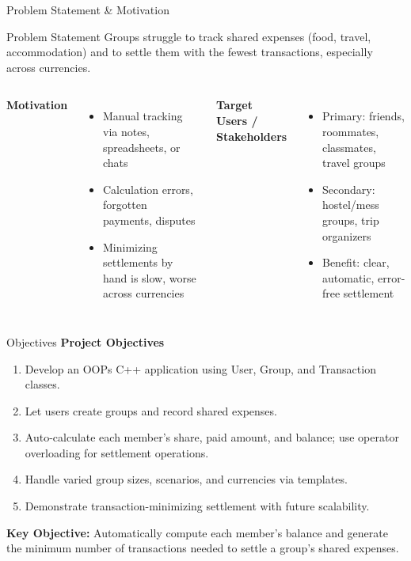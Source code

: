 \documentclass[aspectratio=169,11pt]{beamer}
\begin{document}
\begin{frame}{Problem Statement \& Motivation}
\small
\begin{block}{Problem Statement}
Groups struggle to track shared expenses (food, travel, accommodation) and to settle them with the fewest transactions, especially across currencies.
\end{block}
\vspace{2mm}
\begin{columns}[T,totalwidth=\textwidth]
\textbf{\color{GEUBlue}Motivation}
\begin{itemize}\itemsep1pt
\item Manual tracking via notes, spreadsheets, or chats
\item Calculation errors, forgotten payments, disputes
\item Minimizing settlements by hand is slow, worse across currencies
\end{itemize}
\textbf{\color{GEUBlue}Target Users / Stakeholders}
\begin{itemize}\itemsep1pt
\item Primary: friends, roommates, classmates, travel groups
\item Secondary: hostel/mess groups, trip organizers
\item Benefit: clear, automatic, error-free settlement
\end{itemize}
\end{columns}
\end{frame}

\begin{frame}{Objectives}
\small
\textbf{\color{GEUBlue}Project Objectives}
\vspace{2mm}
\begin{enumerate}\itemsep3pt
\item Develop an OOPs C++ application using User, Group, and Transaction classes.
\item Let users create groups and record shared expenses.
\item Auto-calculate each member's share, paid amount, and balance; use operator overloading for settlement operations.
\item Handle varied group sizes, scenarios, and currencies via templates.
\item Demonstrate transaction-minimizing settlement with future scalability.
\end{enumerate}
\vfill
\begin{center}
\colorbox{GEULightBlue}{\parbox{.80\textwidth}{\centering
\textbf{Key Objective:} Automatically compute each member's balance and generate the minimum number of transactions needed to settle a group's shared expenses.}}
\end{center}
\end{frame}
\end{document}
